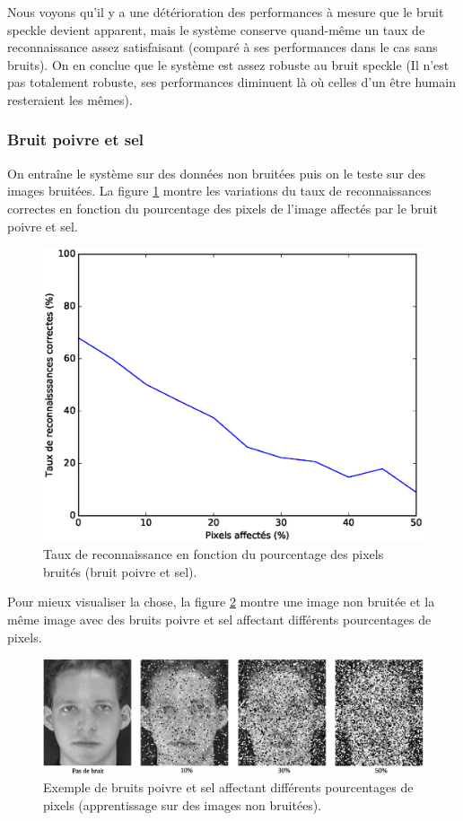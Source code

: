 Nous voyons qu'il y a une détérioration des performances à mesure que le bruit speckle
devient apparent, mais le système conserve quand-même un taux de reconnaissance assez 
satisfaisant (comparé à ses performances dans le cas sans bruits). On en conclue que le
système est assez robuste au bruit speckle (Il n'est pas totalement robuste, ses performances
diminuent là où celles d'un être humain resteraient les mêmes).

\subsubsection{Bruit poivre et sel}
On entraîne le système sur des données non bruitées puis on le teste sur des images
bruitées. La figure \ref{fig:robustness:sp:test} montre les variations du taux
de reconnaissances correctes en fonction du pourcentage des pixels de l'image affectés
par le bruit poivre et sel.
\begin{figure}[H]
    \centering
    \includegraphics[scale=0.5]{images/robustesse_sp_test}
    \caption{Taux de reconnaissance en fonction du pourcentage des pixels bruités (bruit poivre et sel).}
    \label{fig:robustness:sp:test}
\end{figure}
Pour mieux visualiser la chose, la figure \ref{fig:robustness:sp:exemple} montre
une image non bruitée et la même image avec des bruits poivre et sel affectant 
différents pourcentages de pixels.
\begin{figure}[H]
    \centering
    \includegraphics[scale=0.44]{images/robustness_sp_exemple}
    \caption{Exemple de bruits poivre et sel affectant différents pourcentages de pixels
    (apprentissage sur des images non bruitées).}
    \label{fig:robustness:sp:exemple}
\end{figure}


